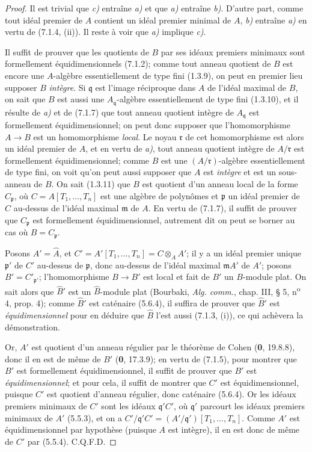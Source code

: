 \begin{proof}
Il est trivial que \emph{c)} entraîne \emph{a)} et que \emph{a)} entraîne \emph{b)}. D'autre part,
comme tout idéal premier de $A$ contient un idéal premier minimal de $A$,
\emph{b)} entraîne \emph{a)} en vertu de (7.1.4, (ii)). Il reste à voir que \emph{a)} implique
\emph{c)}.

Il suffit de prouver que les quotients de $B$ par ses idéaux premiers
minimaux sont formellement équidimensionnels (7.1.2); comme tout anneau
quotient de $B$ est encore une $A$-algèbre essentiellement de type fini
(1.3.9), on peut en premier lieu supposer $B$ \emph{intègre}. Si
$\mathfrak q$ est
l'image réciproque dans $A$ de l'idéal maximal de $B$, on sait que $B$ est
aussi une $A_{\mathfrak q}$-algèbre essentiellement de type fini (1.3.10),
et il résulte de \emph{a)} et de (7.1.7) que tout anneau quotient intègre de
$A_{\mathfrak q}$ est formellement équidimensionnel; on peut donc supposer
que l'homomorphisme $A\to B$ est un homomorphisme \emph{local}. Le noyau
$\mathfrak r$ de cet homomorphisme est alors un idéal premier de $A$, et en
vertu de \emph{a)}, tout anneau quotient intègre de $A/\mathfrak r$ est
formellement équidimensionnel; comme $B$ est une
$(A/\mathfrak r)$-algèbre essentiellement de type fini, on voit qu'on peut
aussi supposer
que $A$ est \emph{intègre} et est un sous-anneau de $B$. On sait (1.3.11)
que $B$
est quotient d'un anneau local de la forme $C_{\mathfrak p}$, où
$C=A[T_1,\ldots,T_n]$ est une algèbre de polynômes et $\mathfrak p$ un
idéal premier de $C$ au-dessus de l'idéal maximal $\mathfrak m$ de $A$. En
vertu de (7.1.7), il suffit de prouver que $C_{\mathfrak p}$ est
formellement équidimensionnel, autrement dit on peut se borner au cas où
$B=C_{\mathfrak p}$.

Posons $A'=\widehat A$, et
$C'=A'[T_1,\ldots,T_n]=C\otimes_AA'$; il y a un idéal premier unique
$\mathfrak p'$ de $C'$ au-dessus de $\mathfrak p$, donc au-dessus de
l'idéal maximal $\mathfrak mA'$ de $A'$; posons $B'=C'_{\mathfrak p'}$;
l'homomorphisme $B\to B'$ est local et fait de $B'$ un $B$-module plat. On
sait alors que $\widehat{B}'$ est un $\widehat B$-module plat (Bourbaki,
\emph{Alg. comm.}, chap. III, § 5, n\textsuperscript{o} 4, prop. 4); comme
$\widehat{B}'$ est caténaire (5.6.4), il suffira de prouver que
$\widehat{B}'$ est \emph{équidimensionnel} pour en déduire que $\widehat B$ l'est
aussi (7.1.3, (i)), ce qui achèvera la démonstration.

Or, $A'$ est quotient d'un anneau régulier par le théorème de Cohen (\textbf{0},
19.8.8), donc il en est de même de $B'$ (\textbf{0}, 17.3.9); en vertu de (7.1.5),
pour montrer que $B'$ est formellement équidimensionnel, il suffit de
prouver que $B'$ est \emph{équidimensionnel}; et pour cela, il suffit de montrer
que $C'$ est équidimensionnel, puisque $C'$ est quotient d'anneau régulier,
donc caténaire (5.6.4). Or les idéaux premiers minimaux de $C'$ sont les
idéaux $\mathfrak q'C'$, où $\mathfrak q'$ parcourt les idéaux premiers
minimaux de $A'$ (5.5.3), et on a
$C'/\mathfrak q'C'=(A'/\mathfrak q')[T_1,\ldots,T_n]$. Comme $A'$ est
équidimensionnel par hypothèse (puisque $A$ est intègre), il en est donc de
même de $C'$ par (5.5.4). C.Q.F.D.
\end{proof}

